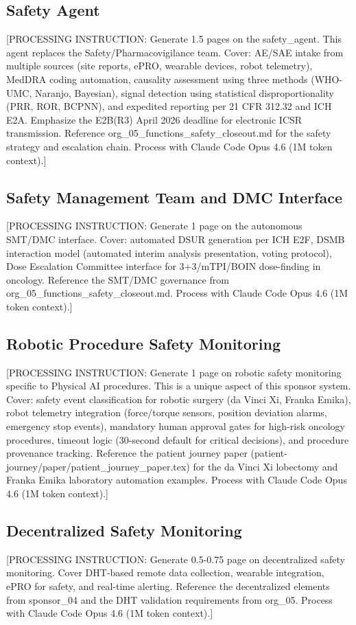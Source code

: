 \subsection{Safety Agent}

[PROCESSING INSTRUCTION: Generate 1.5 pages on the safety\_agent. This agent replaces the
Safety/Pharmacovigilance team. Cover: AE/SAE intake from multiple sources (site reports,
ePRO, wearable devices, robot telemetry), MedDRA coding automation, causality assessment
using three methods (WHO-UMC, Naranjo, Bayesian), signal detection using statistical
disproportionality (PRR, ROR, BCPNN), and expedited reporting per 21 CFR 312.32 and
ICH E2A. Emphasize the E2B(R3) April 2026 deadline for electronic ICSR transmission.
Reference org\_05\_functions\_safety\_closeout.md for the safety strategy and escalation chain.
Process with Claude Code Opus 4.6 (1M token context).]

\subsection{Safety Management Team and DMC Interface}

[PROCESSING INSTRUCTION: Generate 1 page on the autonomous SMT/DMC interface. Cover:
automated DSUR generation per ICH E2F, DSMB interaction model (automated interim
analysis presentation, voting protocol), Dose Escalation Committee interface for
3+3/mTPI/BOIN dose-finding in oncology. Reference the SMT/DMC governance from
org\_05\_functions\_safety\_closeout.md. Process with Claude Code Opus 4.6
(1M token context).]

\subsection{Robotic Procedure Safety Monitoring}

[PROCESSING INSTRUCTION: Generate 1 page on robotic safety monitoring specific to Physical
AI procedures. This is a unique aspect of this sponsor system. Cover: safety event
classification for robotic surgery (da Vinci Xi, Franka Emika), robot telemetry
integration (force/torque sensors, position deviation alarms, emergency stop events),
mandatory human approval gates for high-risk oncology procedures, timeout logic
(30-second default for critical decisions), and procedure provenance tracking.
Reference the patient journey paper (patient-journey/paper/patient\_journey\_paper.tex)
for the da Vinci Xi lobectomy and Franka Emika laboratory automation examples.
Process with Claude Code Opus 4.6 (1M token context).]

\subsection{Decentralized Safety Monitoring}

[PROCESSING INSTRUCTION: Generate 0.5-0.75 page on decentralized safety monitoring.
Cover DHT-based remote data collection, wearable integration, ePRO for safety,
and real-time alerting. Reference the decentralized elements from sponsor\_04 and
the DHT validation requirements from org\_05.
Process with Claude Code Opus 4.6 (1M token context).]
